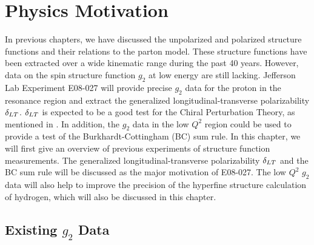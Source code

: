 
\chapter{Physics Motivation}
\label{C4}

In previous chapters, we have discussed the unpolarized and polarized structure functions and their relations to the parton model. These structure functions have been extracted over a wide kinematic range during the past 40 years. However, data on the spin structure function $g_2$ at low energy are still lacking. Jefferson Lab Experiment E08-027 will provide precise $g_2$ data for the proton in the resonance region and extract the generalized longitudinal-transverse polarizability $\delta_{LT}$. $\delta_{LT}$ is expected to be a good test for the Chiral Perturbation Theory, as mentioned in . In addition, the $g_2$ data in the low $Q^2$ region could be used to provide a test of the Burkhardt-Cottingham (BC) sum rule. In this chapter, we will first give an overview of previous experiments of structure function measurements. The generalized longitudinal-transverse polarizability $\delta_{LT}$ and the BC sum rule will be discussed as the major motivation of E08-027. The low $Q^2$ $g_2$ data will also help to improve the precision of the hyperfine structure calculation of hydrogen, which will also be discussed in this chapter.

\section{\texorpdfstring{Existing $g_2$ Data}{Existing g2 Data}}
\label{C4S1}

